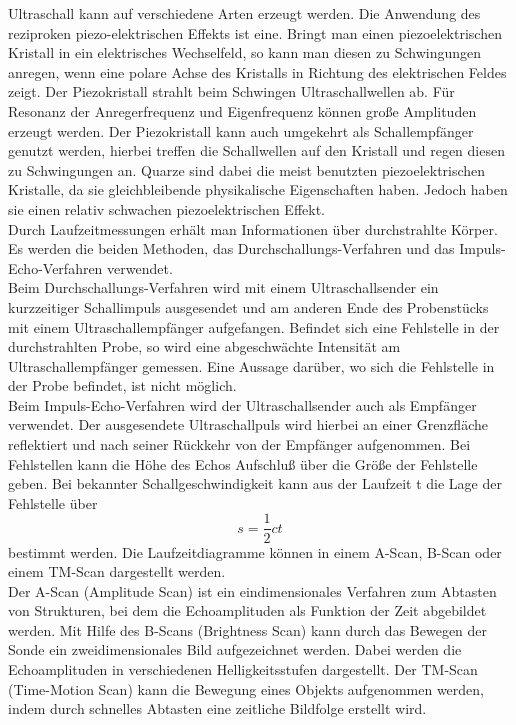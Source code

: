 Ultraschall kann auf verschiedene Arten erzeugt werden.
Die Anwendung des reziproken piezo-elektrischen Effekts ist eine.
Bringt man einen piezoelektrischen
Kristall in ein elektrisches Wechselfeld, so kann man diesen zu Schwingungen anregen, wenn eine polare Achse des Kristalls in Richtung des elektrischen Feldes zeigt.
Der Piezokristall strahlt beim Schwingen Ultraschallwellen ab.
Für Resonanz der Anregerfrequenz und Eigenfrequenz können große Amplituden erzeugt werden.
Der Piezokristall kann auch umgekehrt als Schallempfänger genutzt werden, hierbei treffen die Schallwellen auf den Kristall und regen diesen zu Schwingungen an.
Quarze sind dabei die meist benutzten piezoelektrischen Kristalle, da sie gleichbleibende physikalische Eigenschaften haben. Jedoch haben sie einen relativ schwachen piezoelektrischen Effekt.\\

Durch Laufzeitmessungen erhält man Informationen über durchstrahlte Körper.
Es werden die beiden Methoden, das Durchschallungs-Verfahren und das Impuls-Echo-Verfahren verwendet.\\

Beim Durchschallungs-Verfahren wird mit einem Ultraschallsender ein kurzzeitiger Schallimpuls ausgesendet und am anderen Ende
des Probenstücks mit einem Ultraschallempfänger aufgefangen.
Befindet sich eine Fehlstelle in der durchstrahlten Probe, so wird eine abgeschwächte Intensität am Ultraschallempfänger gemessen.
Eine Aussage darüber, wo sich die Fehlstelle in der Probe befindet, ist nicht möglich. \\

Beim Impuls-Echo-Verfahren wird der Ultraschallsender auch als Empfänger verwendet.
Der ausgesendete Ultraschallpuls wird hierbei an einer Grenzfläche reflektiert und nach seiner Rückkehr von der Empfänger aufgenommen.
Bei Fehlstellen kann die Höhe des Echos Aufschluß über die Größe der Fehlstelle geben.
Bei bekannter Schallgeschwindigkeit kann aus der Laufzeit t die Lage der Fehlstelle über
\begin{equation}
    s = \frac{1}{2} c t
    \label{eqn:gl4}
\end{equation}
bestimmt werden.
Die Laufzeitdiagramme können in einem A-Scan, B-Scan oder einem TM-Scan dargestellt werden. \\

Der A-Scan (Amplitude Scan) ist ein eindimensionales Verfahren zum Abtasten von Strukturen,
bei dem die Echoamplituden als Funktion der Zeit abgebildet werden.
Mit Hilfe des B-Scans (Brightness Scan) kann durch das Bewegen der Sonde ein zweidimensionales Bild aufgezeichnet werden.
Dabei werden die Echoamplituden in verschiedenen Helligkeitsstufen dargestellt.
Der TM-Scan (Time-Motion Scan) kann die Bewegung eines Objekts aufgenommen werden,
indem durch schnelles Abtasten eine zeitliche Bildfolge erstellt wird. \cite{US2}
